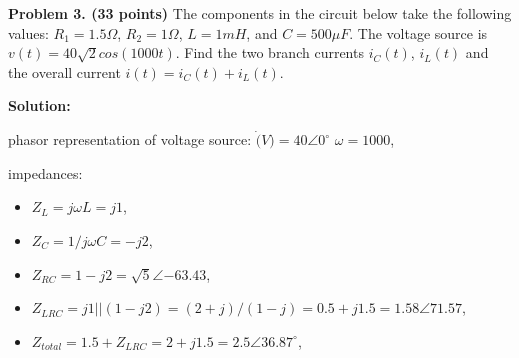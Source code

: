 \begin{enumerate}

\end{enumerate}




\item {\bf Problem 3. (33 points)} 
The components in the circuit below take the following values:
$R_1=1.5\Omega$, $R_2=1\Omega$, $L=1mH$, and $C=500\mu F$. The voltage
source is $v(t)=40\sqrt{2} cos(1000t)$. Find the two branch currents 
$i_C(t)$, $i_L(t)$ and the overall current $i(t)=i_C(t)+i_L(t)$.


{\bf Solution:}

phasor representation of voltage source: $\dot(V)=40\angle{0^\circ}$
$\omega=1000$, 

impedances:
\begin{itemize}
\item $Z_L=j\omega L=j1$, 
\item $Z_C=1/j\omega C=-j2$,
\item $Z_{RC}=1-j2=\sqrt{5}\angle{-63.43}$, 
\item$Z_{LRC}=j1 || (1-j2)=(2+j)/(1-j)=0.5+j1.5=1.58\angle{71.57}$,
\item $Z_{total}=1.5+Z_{LRC}=2+j1.5=2.5\angle{36.87^\circ}$,
\end{itemize}

